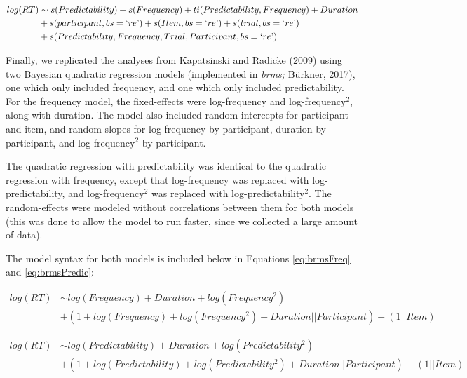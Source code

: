 \documentclass[
  man,floatsintext]{apa6}
\begin{document}
\begin{equation}
\begin{aligned}
\label{eq:gammFull}
log(RT) & \sim s(Predictability) + s(Frequency) + ti (Predictability, Frequency) + Duration \\ & + s(participant, bs = `re\text{'}) + s(Item, bs = `re\text{'})  
+ s(trial, bs = `re\text{'}) \\ & + s(Predictability, Frequency, Trial, Participant, bs = `re\text{'}) 
\end{aligned}
\end{equation}

Finally, we replicated the analyses from Kapatsinski and Radicke (2009) using two Bayesian quadratic regression models (implemented in \emph{brms;} Bürkner, 2017), one which only included frequency, and one which only included predictability. For the frequency model, the fixed-effects were log-frequency and log-frequency\(^2\), along with duration. The model also included random intercepts for participant and item, and random slopes for log-frequency by participant, duration by participant, and log-frequency\(^2\) by participant.

The quadratic regression with predictability was identical to the quadratic regression with frequency, except that log-frequency was replaced with log-predictability, and log-frequency\(^2\) was replaced with log-predictability\(^2\). The random-effects were modeled without correlations between them for both models (this was done to allow the model to run faster, since we collected a large amount of data).

The model syntax for both models is included below in Equations \eqref{eq:brmsFreq} and \eqref{eq:brmsPredic}:

\begin{equation}
\begin{aligned}
\label{eq:brmsFreq}
log(RT) & \sim log(Frequency) + Duration + log(Frequency^2) \\ & + (1 + log(Frequency) + log(Frequency^2) + Duration || Participant) + (1 || Item)
\end{aligned}
\end{equation}

\begin{equation}
\begin{aligned}
\label{eq:brmsPredic}
log(RT) & \sim  log(Predictability) + Duration + log(Predictability^2) \\ & + (1 + log(Predictability) + log(Predictability^2) + Duration || Participant) + (1 || Item)
\end{aligned}
\end{equation}
\end{document}
